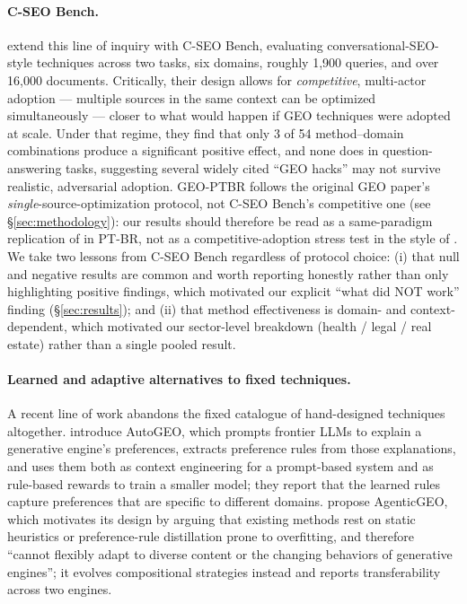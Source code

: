 \documentclass[11pt,a4paper]{article}
\begin{document}
\paragraph{C-SEO Bench.} \citet{puerto2025cseo} extend this line of inquiry
with C-SEO Bench, evaluating conversational-SEO-style techniques across two
tasks, six domains, roughly 1{,}900 queries, and over 16{,}000 documents.
Critically, their design allows for \emph{competitive}, multi-actor
adoption --- multiple sources in the same context can be optimized
simultaneously --- closer to what would happen if GEO techniques were
adopted at scale. Under that regime, they find that only 3 of 54
method--domain combinations produce a significant positive effect, and none
does in question-answering tasks, suggesting several widely cited
``GEO hacks'' may not survive realistic, adversarial adoption. GEO-PTBR
follows the original GEO paper's \emph{single}-source-optimization
protocol, not C-SEO Bench's competitive one (see \S\ref{sec:methodology}):
our results should therefore be read as a same-paradigm replication of
\citet{aggarwal2024geo} in PT-BR, not as a competitive-adoption stress test
in the style of \citet{puerto2025cseo}. We take two lessons from C-SEO Bench
regardless of protocol choice: (i) that null and negative results are
common and worth reporting honestly rather than only highlighting positive
findings, which motivated our explicit ``what did NOT work''
finding (\S\ref{sec:results}); and (ii) that method effectiveness is
domain- and context-dependent, which motivated our sector-level breakdown
(health / legal / real estate) rather than a single pooled result.

\paragraph{Learned and adaptive alternatives to fixed techniques.} A recent
line of work abandons the fixed catalogue of hand-designed techniques
altogether. \citet{wu2026autogeo} introduce AutoGEO, which prompts frontier
LLMs to explain a generative engine's preferences, extracts preference rules
from those explanations, and uses them both as context engineering for a
prompt-based system and as rule-based rewards to train a smaller model;
they report that the learned rules capture preferences that are specific to
different domains. \citet{yuan2026agenticgeo} propose AgenticGEO, which
motivates its design by arguing that existing methods rest on static
heuristics or preference-rule distillation prone to overfitting, and
therefore ``cannot flexibly adapt to diverse content or the changing
behaviors of generative engines''; it evolves compositional strategies
instead and reports transferability across two engines.
\end{document}
